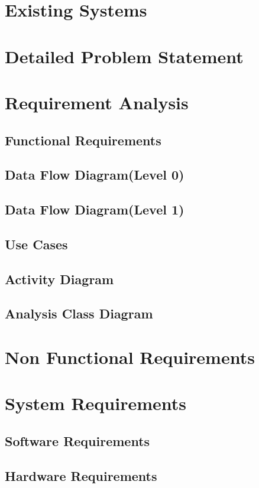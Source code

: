\section{Existing Systems}

\section{Detailed Problem Statement}

\section{Requirement Analysis}



    \subsection{Functional Requirements}

    \subsection{Data Flow Diagram(Level 0)}

    \subsection{Data Flow Diagram(Level 1)}

    
    \subsection{Use Cases}

    \subsection{Activity Diagram}

    \subsection{Analysis Class Diagram}


\section{Non Functional Requirements}

\section{System Requirements}

    \subsection{Software Requirements}
   
    \subsection{Hardware Requirements}
    